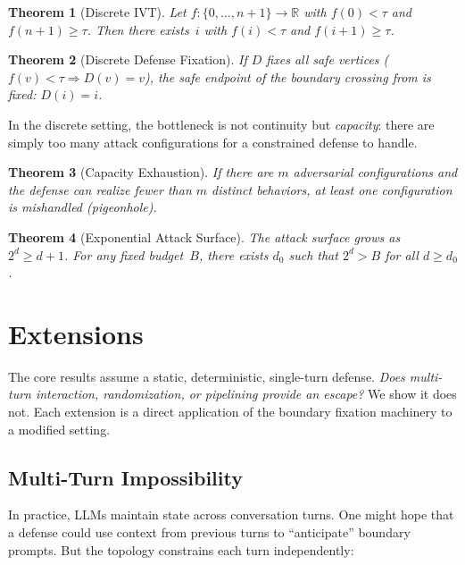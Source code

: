 \documentclass[11pt]{article}
\newtheorem{theorem}{Theorem}[section]
\newcommand{\R}{\mathbb{R}}
\begin{document}
\begin{theorem}[Discrete IVT]
\label{thm:disc-ivt}
Let $f\colon \{0,\ldots,n{+}1\} \to \R$ with $f(0) < \tau$ and
$f(n{+}1) \geq \tau$. Then there exists~$i$ with $f(i) < \tau$ and
$f(i{+}1) \geq \tau$.
\end{theorem}

\begin{theorem}[Discrete Defense Fixation]
\label{thm:disc-defense}
If $D$ fixes all safe vertices ($f(v) < \tau \Rightarrow D(v) = v$),
the safe endpoint of the boundary crossing from 
is fixed: $D(i) = i$.
\end{theorem}

In the discrete setting, the bottleneck is not continuity but
\emph{capacity}: there are simply too many attack configurations for a
constrained defense to handle.

\begin{theorem}[Capacity Exhaustion]
\label{thm:pigeonhole}
If there are $m$ adversarial configurations and the defense can realize
fewer than $m$ distinct behaviors, at least one configuration is
mishandled (pigeonhole).
\end{theorem}

\begin{theorem}[Exponential Attack Surface]
\label{thm:budget}
The attack surface grows as $2^d \geq d + 1$. For any fixed budget~$B$,
there exists $d_0$ such that $2^d > B$ for all $d \geq d_0$.
\end{theorem}


\section{Extensions}
\label{sec:extensions}

The core results assume a static, deterministic, single-turn defense. \emph{Does multi-turn interaction, randomization,
or pipelining provide an escape?} We show it does not. Each extension
is a direct application of the boundary fixation machinery to a
modified setting.

\subsection{Multi-Turn Impossibility}

In practice, LLMs maintain state across conversation turns. One might
hope that a defense could use context from previous turns to
``anticipate'' boundary prompts. But the topology constrains each turn
independently:
\end{document}
